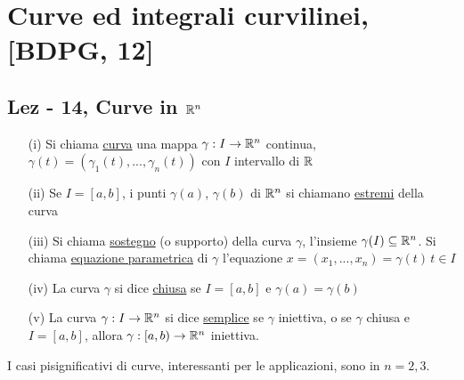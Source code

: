 \chapter{Curve ed integrali curvilinei, [BDPG, 12]}
\section{Lez - 14, Curve in $\mathbb{R}^n$}
\begin{definition}
  \begin{itemize}
    \item[(i)] Si chiama \underline{curva} una mappa $\gamma:I \to \mathbb{R}^n$ continua, 
                $\gamma(t) = (\gamma_1(t),...,\gamma_n(t))$
                con $I$ intervallo di $\mathbb{R}$
    \item[(ii)] Se $I = [a,b]$, i punti $\gamma(a)$, $\gamma(b)$ di $\mathbb{R}^n$ si chiamano
                \underline{estremi} della curva
    \item[(iii)] Si chiama \underline{sostegno} (o supporto) della curva $\gamma$, l'insieme 
                  $\gamma(I) \subseteq \mathbb{R}^n$. Si chiama \underline{equazione parametrica} di $\gamma$ 
                  l'equazione $x = (x_1,...,x_n) = \gamma(t) \, t \in I$
    \item[(iv)] La curva $\gamma$ si dice \underline{chiusa} se $I = [a,b]$ e $\gamma(a) = \gamma(b)$
    \item[(v)] La curva $\gamma:I\to\mathbb{R}^n$ si dice \underline{semplice} se $\gamma$ \ace iniettiva, o 
                se $\gamma$ \ace chiusa e $I = [a,b]$, allora $\gamma :[a,b) \to \mathbb{R}^n$ \ace iniettiva.
  \end{itemize}
\end{definition}
I casi pi\acu significativi di curve, interessanti per le applicazioni, sono in $n=2,3$.
